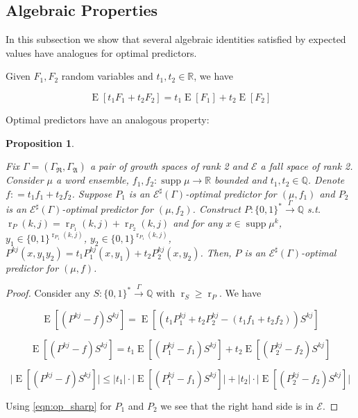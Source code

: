 \documentclass{article}
\numberwithin{equation}{section}
\theoremstyle{definition}
\theoremstyle{plain}
\newtheorem{proposition}{Proposition}[section]
\newcommand{\Words}{{\{ 0, 1 \}^*}}
\newcommand{\WordsLen}[1]{{\{ 0, 1 \}^{#1}}}
\DeclareMathOperator{\Supp}{supp}
\DeclareMathOperator{\E}{E}
\DeclareMathOperator{\R}{r}
\newcommand{\Rats}{\mathbb{Q}}
\newcommand{\Reals}{\mathbb{R}}
\newcommand{\Abs}[1]{\lvert #1 \rvert}
\begin{document}
\subsection{Algebraic Properties}

In this subsection we show that several algebraic identities satisfied by expected values have analogues for optimal predictors.

Given $F_1,F_2$ random variables and $t_1,t_2 \in \Reals$, we have 

\begin{equation}
\E[t_1 F_1 + t_2 F_2] = t_1 \E[F_1] + t_2 \E[F_2]
\end{equation}

Optimal predictors have an analogous property:

\begin{proposition}
\label{prp:linearity}

Fix $\Gamma=(\Gamma_{\mathfrak{R}},\Gamma_{\mathfrak{A}})$ a pair of growth spaces of rank 2 and $\mathcal{E}$ a fall space of rank 2. Consider $\mu$ a word ensemble, $f_1,f_2: \Supp \mu \rightarrow \Reals$ bounded and $t_1,t_2 \in \Rats$. Denote $f: = t_1 f_1 + t_2 f_2$. Suppose $P_1$ is an $\mathcal{E}^\sharp(\Gamma)$-optimal predictor for $(\mu,f_1)$ and $P_2$ is an $\mathcal{E}^\sharp(\Gamma)$-optimal predictor for $(\mu,f_2)$. Construct $P: \Words \xrightarrow{\Gamma} \Rats$ s.t. $\R_P(k,j) = \R_{P_1}(k,j) + \R_{P_2}(k,j)$ and for any $x \in \Supp \mu^k$, $y_1 \in \WordsLen{\R_{P_1}(k,j)}$, $y_2 \in \WordsLen{\R_{P_1}(k,j)}$, $P^{kj}(x,y_1 y_2)=t_1 P_1^{kj}(x,y_1) + t_2 P_2^{kj}(x, y_2)$. Then, $P$ is an $\mathcal{E}^\sharp(\Gamma)$-optimal predictor for $(\mu, f)$.

\end{proposition}

\begin{proof}

Consider any $S: \Words \xrightarrow{\Gamma} \Rats$ with $\R_S \geq \R_P$. We have

$$\E[(P^{kj} - f)S^{kj}] = \E[(t_1 P_1^{kj} + t_2 P_2^{kj} - (t_1 f_1 + t_2 f_2))S^{kj}]$$

$$\E[(P^{kj} - f)S^{kj}] = t_1 \E[(P_1^{kj} - f_1)S^{kj}] + t_2 \E[(P_2^{kj} - f_2)S^{kj}]$$

$$\Abs{\E[(P^{kj} - f)S^{kj}]} \leq \Abs{t_1} \cdot \Abs{\E[(P_1^{kj} - f_1)S^{kj}]} + \Abs{t_2} \cdot \Abs{\E[(P_2^{kj} - f_2)S^{kj}]}$$

Using \ref{eqn:op_sharp} for $P_1$ and $P_2$ we see that the right hand side is in $\mathcal{E}$.

\end{proof}
\end{document}
